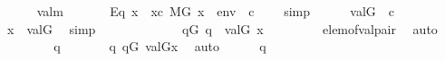 \begin{isabellebody}
\ \ \ \ \isamarkupfalse%
\ val{\isacharunderscore}{\kern0pt}m\ \isanewline
\ \ \ \ \isamarkupfalse%
\ Eq{}{\isacharcolon}{\kern0pt}\ {\isachardoublequoteopen}x\ {\isasymin}\ {\isacharbraceleft}{\kern0pt}x{\isasymin}c{\isachardot}{\kern0pt}\ {\isacharparenleft}{\kern0pt}M{\isacharbrackleft}{\kern0pt}G{\isacharbrackright}{\kern0pt}{\isacharcomma}{\kern0pt}\ {\isacharbrackleft}{\kern0pt}x{\isacharbrackright}{\kern0pt}\ {\isacharat}{\kern0pt}\ env\ {\isacharat}{\kern0pt}\ {\isacharbrackleft}{\kern0pt}c{\isacharbrackright}{\kern0pt}\ {\isasymTurnstile}\ {\isasymphi}{\isacharparenright}{\kern0pt}{\isacharbraceright}{\kern0pt}{\isachardoublequoteclose}\ \isamarkupfalse%
\ simp\isanewline
\ \ \ \ \isamarkupfalse%
\ {\isacartoucheopen}val{\isacharparenleft}{\kern0pt}G{\isacharcomma}{\kern0pt}{\isasympi}{\isacharparenright}{\kern0pt}\ {\isacharequal}{\kern0pt}\ c{\isacartoucheclose}\isanewline
\ \ \ \ \isamarkupfalse%
\ {\isachardoublequoteopen}x\ {\isasymin}\ val{\isacharparenleft}{\kern0pt}G{\isacharcomma}{\kern0pt}{\isasympi}{\isacharparenright}{\kern0pt}{\isachardoublequoteclose}\ \isamarkupfalse%
\ simp\isanewline
\ \ \ \ \isamarkupfalse%
\ \isanewline
\ \ \ \ \isamarkupfalse%
\ {\isachardoublequoteopen}{\isasymexists}{\isasymtheta}{\isachardot}{\kern0pt}\ {\isasymexists}q{\isasymin}G{\isachardot}{\kern0pt}\ {\isasymlangle}{\isasymtheta}{\isacharcomma}{\kern0pt}q{\isasymrangle}{\isasymin}{\isasympi}\ {\isasymand}\ val{\isacharparenleft}{\kern0pt}G{\isacharcomma}{\kern0pt}{\isasymtheta}{\isacharparenright}{\kern0pt}\ {\isacharequal}{\kern0pt}x{\isachardoublequoteclose}\ \isanewline
\ \ \ \ \ \ \isamarkupfalse%
\ elem{\isacharunderscore}{\kern0pt}of{\isacharunderscore}{\kern0pt}val{\isacharunderscore}{\kern0pt}pair\ \isamarkupfalse%
\ auto\isanewline
\ \ \ \ \isamarkupfalse%
\ \isamarkupfalse%
\ {\isasymtheta}\ q\ \isanewline
\ \ \ \ \ \ {\isachardoublequoteopen}{\isasymlangle}{\isasymtheta}{\isacharcomma}{\kern0pt}q{\isasymrangle}{\isasymin}{\isasympi}{\isachardoublequoteclose}\ {\isachardoublequoteopen}q{\isasymin}G{\isachardoublequoteclose}\ {\isachardoublequoteopen}val{\isacharparenleft}{\kern0pt}G{\isacharcomma}{\kern0pt}{\isasymtheta}{\isacharparenright}{\kern0pt}{\isacharequal}{\kern0pt}x{\isachardoublequoteclose}\ \isamarkupfalse%
\ auto\isanewline
\ \ \ \ \isamarkupfalse%
\ {\isacartoucheopen}{\isasymlangle}{\isasymtheta}{\isacharcomma}{\kern0pt}q{\isasymrangle}{\isasymin}{\isasympi}{\isacartoucheclose}\isanewline

\end{isabellebody}

